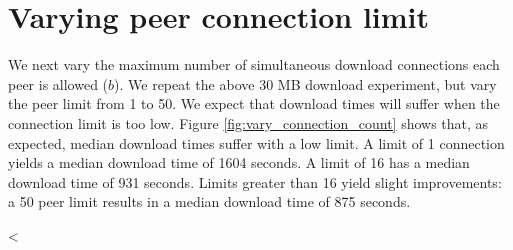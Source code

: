 \section{Varying peer connection limit} 

We next vary the maximum number of simultaneous download connections each peer is allowed ($b$). We 
repeat the above 30 MB download experiment, but vary the peer limit from 1 to 50. 
We expect that download times will suffer when the connection limit is too low. Figure \ref{fig:vary_connection_count} shows that, as expected, median 
download times suffer with a low limit.  A limit of 1 connection yields a median download time of 1604 seconds.  A limit of 16 has a median download time of 931 seconds.  Limits greater than 16 yield
slight improvements: a 50 peer limit results in a median download time of 875 seconds.

<%
